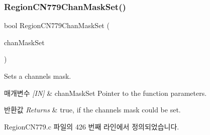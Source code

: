 \subsubsection{\texorpdfstring{Region\+C\+N779\+Chan\+Mask\+Set()}{RegionCN779ChanMaskSet()}}
{\footnotesize\ttfamily bool Region\+C\+N779\+Chan\+Mask\+Set (\begin{DoxyParamCaption}\item[{\mbox{\hyperlink{group___r_e_g_i_o_n_ga6d24f7da136006410827dfb29f6b9b9e}{Chan\+Mask\+Set\+Params\+\_\+t}} $\ast$}]{chan\+Mask\+Set }\end{DoxyParamCaption})}



Sets a channels mask. 


\begin{DoxyParams}{매개변수}
{\em \mbox{[}\+I\+N\mbox{]}} & chan\+Mask\+Set Pointer to the function parameters.\\
\hline
\end{DoxyParams}

\begin{DoxyRetVals}{반환값}
{\em Returns} & true, if the channels mask could be set. \\
\hline
\end{DoxyRetVals}


Region\+C\+N779.\+c 파일의 426 번째 라인에서 정의되었습니다.


